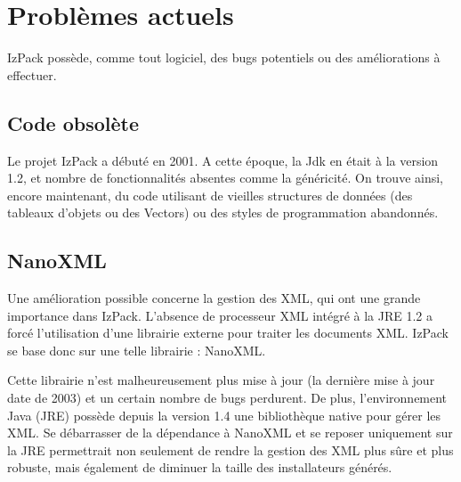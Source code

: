 \section{Problèmes actuels}
IzPack possède, comme tout logiciel, des bugs potentiels ou des améliorations à effectuer.

\subsection{Code obsolète}
Le projet IzPack a débuté en 2001.
A cette époque, la Jdk en était à la version 1.2, et nombre de fonctionnalités absentes comme la généricité.
On trouve ainsi, encore maintenant, du code utilisant de vieilles structures de données (des tableaux d'objets ou des Vectors) ou des styles de programmation abandonnés.

\subsection{NanoXML}
Une amélioration possible concerne la gestion des XML, qui ont une grande importance dans IzPack.
L'absence de processeur XML intégré à la JRE 1.2 a forcé l'utilisation d'une librairie externe pour traiter les documents XML.
IzPack se base donc sur une telle librairie : NanoXML.

Cette librairie n'est malheureusement plus mise à jour (la dernière mise à jour date de 2003) et un certain nombre de bugs perdurent.
De plus, l'environnement Java (JRE) possède depuis la version 1.4 une bibliothèque native pour gérer les XML.
Se débarrasser de la dépendance à NanoXML et se reposer uniquement sur la JRE permettrait non seulement de rendre la gestion des XML plus sûre et plus robuste, mais également de diminuer la taille des installateurs générés.